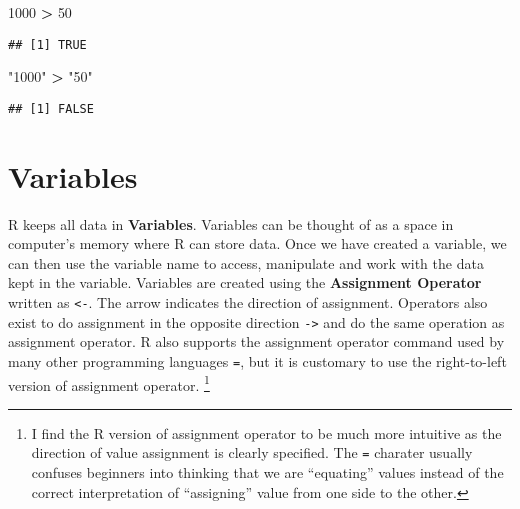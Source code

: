 \documentclass[
]{krantz}
\makeatletter
\newenvironment{Shaded}{\begin{snugshade}}{\end{snugshade}}
\newcommand{\CommentTok}[1]{\textcolor[rgb]{0.37,0.37,0.37}{\textit{#1}}}
\newcommand{\DecValTok}[1]{\textcolor[rgb]{0.06,0.06,0.06}{#1}}
\newcommand{\KeywordTok}[1]{\textcolor[rgb]{0.27,0.27,0.27}{\textbf{#1}}}
\newcommand{\NormalTok}[1]{#1}
\newcommand{\OperatorTok}[1]{\textcolor[rgb]{0.43,0.43,0.43}{\textbf{#1}}}
\newcommand{\StringTok}[1]{\textcolor[rgb]{0.5,0.5,0.5}{#1}}
\newenvironment{kframe}{%
\medskip{}
\setlength{\fboxsep}{.8em}
 \def\at@end@of@kframe{}%
 \ifinner\ifhmode%
  \def\at@end@of@kframe{\end{minipage}}%
  \begin{minipage}{\columnwidth}%
 \fi\fi%
 \def\FrameCommand##1{\hskip\@totalleftmargin \hskip-\fboxsep
 \colorbox{shadecolor}{##1}\hskip-\fboxsep
     \hskip-\linewidth \hskip-\@totalleftmargin \hskip\columnwidth}%
 \MakeFramed {\advance\hsize-\width
   \@totalleftmargin\z@ \linewidth\hsize
   \@setminipage}}%
 {\par\unskip\endMakeFramed%
 \at@end@of@kframe}
\renewenvironment{Shaded}{\begin{kframe}}{\end{kframe}}
\makeatother
\begin{document}
\begin{Shaded}
\begin{Highlighting}[]
\DecValTok{1000} \OperatorTok{>}\StringTok{ }\DecValTok{50}
\end{Highlighting}
\end{Shaded}

\begin{verbatim}
## [1] TRUE
\end{verbatim}

\begin{Shaded}
\begin{Highlighting}[]
\StringTok{"1000"} \OperatorTok{>}\StringTok{ "50"}
\end{Highlighting}
\end{Shaded}

\begin{verbatim}
## [1] FALSE
\end{verbatim}

\hypertarget{variables}{%
\section{Variables}\label{variables}}

R keeps all data in \textbf{Variables}. Variables can be thought of as a space in computer's memory where R can store data. Once we have created a variable, we can then use the variable name to access, manipulate and work with the data kept in the variable. Variables are created using the \textbf{Assignment Operator} written as \texttt{\textless{}-}. The arrow indicates the direction of assignment. Operators also exist to do assignment in the opposite direction \texttt{-\textgreater{}} and do the same operation as assignment operator. R also supports the assignment operator command used by many other programming languages \texttt{=}, but it is customary to use the right-to-left version of assignment operator. \footnote{I find the R version of assignment operator to be much more intuitive as the direction of value assignment is clearly specified. The \texttt{=} charater usually confuses beginners into thinking that we are ``equating'' values instead of the correct interpretation of ``assigning'' value from one side to the other.}

\begin{Shaded}
\end{Shaded}
\end{document}
